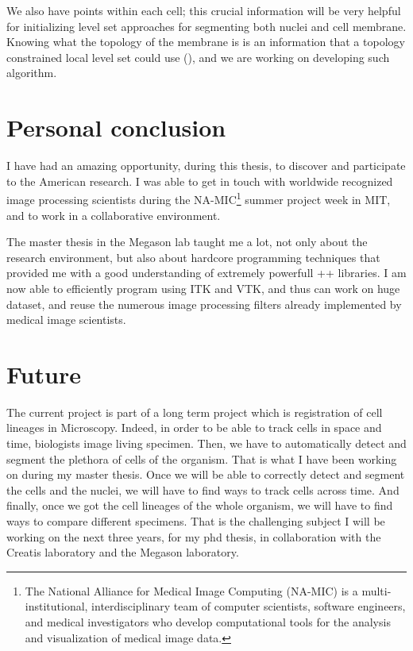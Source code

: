 We also have points within each cell; this crucial information will be very helpful for initializing level set approaches for segmenting both nuclei and cell membrane.
Knowing what the topology of the membrane is is an information
that a topology constrained local level set could use (\cite{han2003topology,lankton2008localizing}), and we are working on developing such algorithm.


\section{Personal conclusion}

I have had an amazing opportunity, during this thesis,
to discover and participate to the American research.
I was able to get in touch with worldwide recognized
image processing scientists during the NA-MIC\footnote{
The National Alliance for Medical Image Computing (NA-MIC) is a multi-institutional, interdisciplinary team of computer scientists, software engineers, and medical investigators who develop computational tools for the analysis and visualization of medical image data.}
summer project week in MIT, and to work in a collaborative environment.

The master thesis in the Megason lab taught me a lot, not only about the research environment, but also about hardcore programming techniques that provided me with a good understanding of extremely powerfull \C++ libraries. I am now able to efficiently program using ITK and VTK, and thus can work on huge dataset, and reuse the numerous image processing filters already implemented by medical image scientists.

\section{Future}

The current project is part of a long term project which is registration of cell lineages in Microscopy.
Indeed, in order to be able to track cells in space and time, biologists image living specimen. Then, we have to automatically detect and segment the plethora of cells of the organism. That is what I have been working on during my master thesis.
Once we will be able to correctly detect and segment the cells and the nuclei, we will have to find ways to track cells across time. And finally, once we got the cell lineages of the whole organism, we will have to find ways to compare different specimens. That is the challenging subject I will be working on the next three years, for my phd thesis, in collaboration with the Creatis laboratory and the Megason laboratory.


